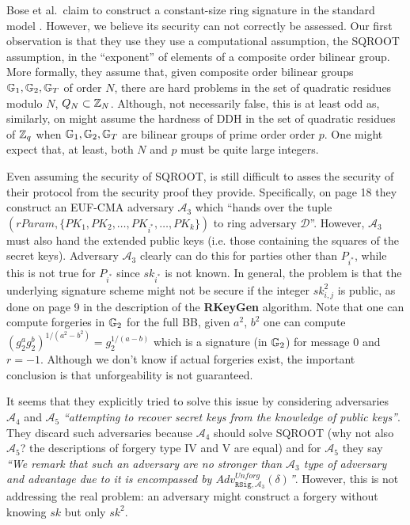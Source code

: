 
Bose et al.~claim to construct a constant-size ring signature in the standard model \cite{ACISP:BosDasRan15}. However, we believe its security can not correctly be assessed. Our first observation is that they use they use a computational assumption, the SQROOT assumption, in the ``exponent'' of elements of a composite order bilinear group. More formally, they assume that, given composite order bilinear groups $\mathbb{G}_1,\mathbb{G}_2,\mathbb{G}_T$ of order $N$, there are hard problems in the set of quadratic residues modulo $N$, $Q_N\subset \mathbb{Z}_N$. Although, not necessarily false, this is at least odd as, similarly, on might assume the hardness of DDH in the set of quadratic residues of $\mathbb{Z}_q$ when $\mathbb{G}_1,\mathbb{G}_2,\mathbb{G}_T$ are bilinear groups of prime order order $p$. One might expect that, at least, both $N$ and $p$ must be quite large integers.

Even assuming the security of SQROOT, is still difficult to asses the security of their protocol from the security proof they provide. Specifically, on page 18 they construct an EUF-CMA adversary $\mathcal{A}_3$ which ``hands over the tuple $(rParam, \{PK_1, PK_2, \ldots, PK_{i^*} , \ldots, PK_k\})$ to ring adversary $\mathcal{D}$''. However, $\mathcal{A}_3$ must also hand the extended public keys (i.e. those containing the squares of the secret keys). Adversary $\mathcal{A}_3$ clearly can do this for parties other than $P_{i^*}$, while this is not true for $P_{i^*}$ since $sk_{i^*}$ is not known.
In general, the problem is that the underlying signature scheme might not be secure if the integer $sk_{i,j}^2$ is public, as done on page 9 in the description of the {\bf RKeyGen} algorithm. Note that one can compute forgeries in $\mathbb{G}_2$ for the full BB, given $a^2$, $b^2$ one can compute $(g_2^{a} g_2^{b})^{1/(a^2-b^2)}=g_2^{1/(a-b)}$ which is a signature (in $\mathbb{G}_2$) for message $0$ and $r=-1$. Although we don't know if actual forgeries exist, the important conclusion is that unforgeability is not guaranteed.

It seems that they explicitly tried to solve this issue by considering adversaries $\mathcal{A}_4$ and $\mathcal{A}_5$ \emph{``attempting to recover secret keys from the knowledge of public keys''}. 
They discard such adversaries because $\mathcal{A}_4$ should solve  SQROOT (why not also $\mathcal{A}_5$? the descriptions of forgery type IV and V are equal) and for $\mathcal{A}_5$ they say \emph{``We remark that such an adversary are no stronger than $\mathcal{A}_3$ type of adversary and advantage due to it is encompassed by $Adv^{Unforg}_{\mathtt{RSig},\mathcal{A}_3} (\delta)$''}. However, this is not addressing the real problem: an adversary might construct a forgery without knowing $sk$ but only $sk^2$.

